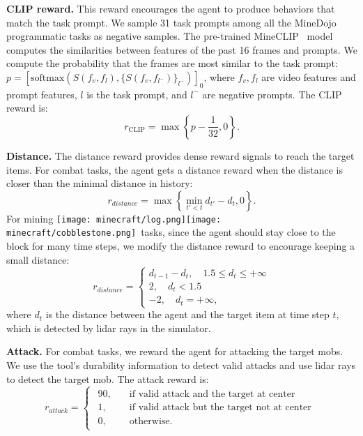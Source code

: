 \documentclass{article}
\newcommand{\mccobblestone}{\texttt{[image: minecraft/cobblestone.png]}}
\newcommand{\mclog}{\texttt{[image: minecraft/log.png]}}
\begin{document}
\textbf{CLIP reward.} This reward encourages the agent to produce behaviors that match the task prompt. We sample 31 task prompts among all the MineDojo programmatic tasks as negative samples. The pre-trained MineCLIP~\citep{minedojo} model computes the similarities between features of the past 16 frames and prompts. We compute the probability that the frames are most similar to the task prompt: $p=\left[\mathrm{softmax}\left(S\left(f_v, f_l\right), \{S\left(f_v,f_{l^-}\right)\}_{l^-}\right)\right]_0$, where $f_v, f_l$ are video features and prompt features, $l$ is the task prompt, and $l^-$ are negative prompts. The CLIP reward is:
\begin{equation}
    r_{\mathrm{CLIP}} = \max{\left\{p-\frac{1}{32}, 0\right\}}.
\end{equation}

\textbf{Distance.} The distance reward provides dense reward signals to reach the target items. For combat tasks, the agent gets a distance reward when the distance is closer than the minimal distance in history:
\begin{equation}
    r_{distance} = \max \left\{ \min_{t'<t}{d_{t'}} - d_t, 0 \right\}.
\end{equation}
For mining \mclog\mccobblestone \ tasks, since the agent should stay close to the block for many time steps, we modify the distance reward to encourage keeping a small distance:
\begin{equation}
r_{distance}=
\begin{cases}
        d_{t-1}-d_{t},  \quad 1.5\le d_t \le +\infty \\
        2, \quad d_t<1.5 \\
        -2, \quad d_t=+\infty,
\end{cases}
\end{equation}
where $d_t$ is the distance between the agent and the target item at time step $t$, which is detected by lidar rays in the simulator.

\textbf{Attack.} For combat tasks, we reward the agent for attacking the target mobs. We use the tool's durability information to detect valid attacks and use lidar rays to detect the target mob. The attack reward is:
\begin{equation}
r_{attack} = 
\begin{cases}
\begin{aligned}
 90, & \quad \text{if  valid attack and the target at center }  \\
 1, & \quad \text{if valid attack but the target not at center}  \\
 0, & \quad \text{otherwise. }
\end{aligned}
\end{cases}
\end{equation}
\end{document}
